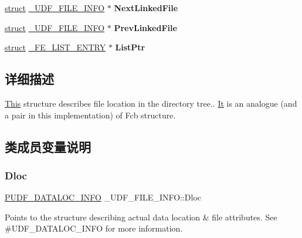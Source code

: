 \begin{DoxyCompactItemize}
\hyperlink{interfacestruct}{struct} \hyperlink{struct___u_d_f___f_i_l_e___i_n_f_o}{\+\_\+\+U\+D\+F\+\_\+\+F\+I\+L\+E\+\_\+\+I\+N\+FO} $\ast$ {\bfseries Next\+Linked\+File}
\item 
\mbox{\label{struct___u_d_f___f_i_l_e___i_n_f_o_a372750d54f6a3e9730c06032a6cff8eb}} 
\hyperlink{interfacestruct}{struct} \hyperlink{struct___u_d_f___f_i_l_e___i_n_f_o}{\+\_\+\+U\+D\+F\+\_\+\+F\+I\+L\+E\+\_\+\+I\+N\+FO} $\ast$ {\bfseries Prev\+Linked\+File}
\item 
\mbox{\label{struct___u_d_f___f_i_l_e___i_n_f_o_a13102c9145b14582ba2ac5313b5dcb30}} 
\hyperlink{interfacestruct}{struct} \hyperlink{struct___f_e___l_i_s_t___e_n_t_r_y}{\+\_\+\+F\+E\+\_\+\+L\+I\+S\+T\+\_\+\+E\+N\+T\+RY} $\ast$ {\bfseries List\+Ptr}
\end{DoxyCompactItemize}


\subsection{详细描述}
\hyperlink{namespace_this}{This} structure describes file location in the directory tree.. \hyperlink{class_it}{It} is an analogue (and a pair in this implementation) of Fcb structure. 

\subsection{类成员变量说明}
\mbox{\label{struct___u_d_f___f_i_l_e___i_n_f_o_a7a3581004b1dd01ed74fa5d05fa9e362}} 
\subsubsection{\texorpdfstring{Dloc}{Dloc}}
{\footnotesize\ttfamily \hyperlink{struct___u_d_f___d_a_t_a_l_o_c___i_n_f_o}{P\+U\+D\+F\+\_\+\+D\+A\+T\+A\+L\+O\+C\+\_\+\+I\+N\+FO} \+\_\+\+U\+D\+F\+\_\+\+F\+I\+L\+E\+\_\+\+I\+N\+F\+O\+::\+Dloc}

Points to the structure describing actual data location \& file attributes. See \#\+U\+D\+F\+\_\+\+D\+A\+T\+A\+L\+O\+C\+\_\+\+I\+N\+FO for more information. \mbox{\label{struct___u_d_f___f_i_l_e___i_n_f_o_a7d403e7b31cf51ae954af5fd4716d67e}} 
